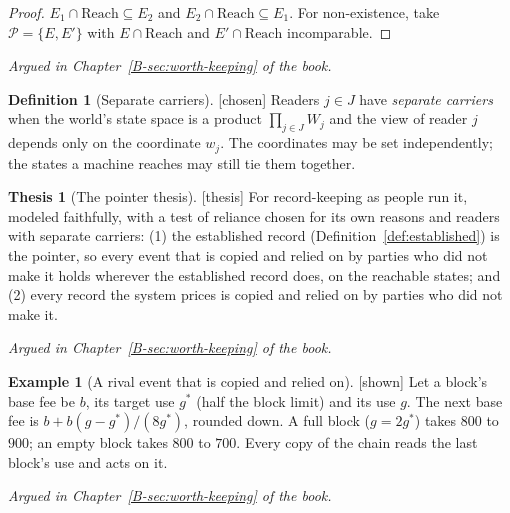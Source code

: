 \documentclass[11pt, a4paper]{article}
\theoremstyle{plain}
\theoremstyle{definition}
\newtheorem{definition}[theorem]{Definition}
\newtheorem{example}[theorem]{Example}
\newtheorem{thesis}[theorem]{Thesis}
\theoremstyle{remark}
\newcommand{\argued}[1]{\par\noindent\textit{Argued in Chapter~\ref{B-#1} of the book.}\par}
\newcommand{\kind}[1]{\textup{[#1]}}
\begin{document}
\begin{proof}
$E_1\cap\mathrm{Reach}\subseteq E_2$ and $E_2\cap\mathrm{Reach}\subseteq E_1$. For non-existence, take
$\mathcal P=\{E,E'\}$ with $E\cap\mathrm{Reach}$ and $E'\cap\mathrm{Reach}$ incomparable.
\end{proof}

\argued{sec:worth-keeping}

\begin{definition}[Separate carriers]\label{spec:carriers} \kind{chosen}
Readers $j\in J$ have \emph{separate carriers} when the world's state space is a product
$\prod_{j\in J}W_j$ and the view of reader $j$ depends only on the coordinate $w_j$. The coordinates may be
set independently; the states a machine reaches may still tie them together.
\end{definition}

\begin{thesis}[The pointer thesis]\label{spec:pointer-thesis} \kind{thesis}
For record-keeping as people run it, modeled faithfully, with a test of reliance chosen for its own
reasons and readers with separate carriers: (1) the established record (Definition~\ref{def:established})
is the pointer, so every event that is copied and relied on by parties who did not make it holds wherever
the established record does, on the reachable states; and (2) every record the system prices is copied and
relied on by parties who did not make it.
\end{thesis}

\argued{sec:worth-keeping}

\begin{example}[A rival event that is copied and relied on]\label{spec:base-fee} \kind{shown}
Let a block's base fee be $b$, its target use $g^*$ (half the block limit) and its use $g$. The next base
fee is $b+b(g-g^*)/(8g^*)$, rounded down. A full block ($g=2g^*$) takes $800$ to $900$; an empty block
takes $800$ to $700$. Every copy of the chain reads the last block's use and acts on it.
\end{example}

\argued{sec:worth-keeping}
\end{document}
